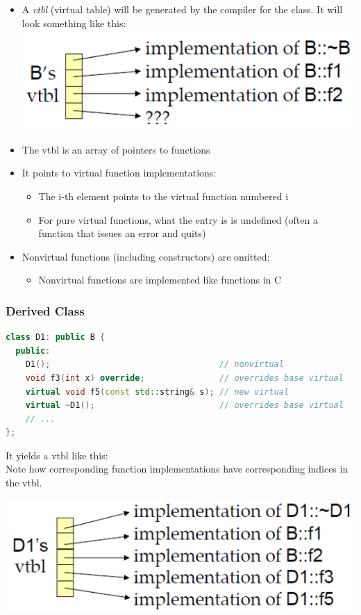 \begin{itemize}
  \item A \textit{vtbl} (virtual table) will be generated by the compiler for the class. It will look something like this:
  \includegraphics[width=0.3\linewidth]{images/AdvancedCPP/vtbl}
  \item The vtbl is an array of pointers to functions
  \item It points to virtual function implementations:
  \begin{itemize}
    \item The i-th element points to the virtual function numbered i
    \item For pure virtual functions, what the entry is is undefined (often a function that issues an error and quits)
  \end{itemize}
  \item Nonvirtual functions (including constructors) are omitted:
  \begin{itemize}
    \item Nonvirtual functions are implemented like functions in C
  \end{itemize}
\end{itemize}

\subsubsection{Derived Class}
\begin{lstlisting}[language=C++]
class D1: public B {
  public:
    D1();                                  // nonvirtual
    void f3(int x) override;               // overrides base virtual
    virtual void f5(const std::string& s); // new virtual
    virtual ~D1();                         // overrides base virtual
    // ...
};
\end{lstlisting}

\begin{minipage}{0.7\linewidth}
It yields a vtbl like this:\\

Note how corresponding function implementations have corresponding indices in the vtbl.
\end{minipage}%
\begin{minipage}{0.3\linewidth}
\includegraphics[width=\linewidth]{images/AdvancedCPP/vtbl2}
\end{minipage}
\vspace{\baselineskip}

